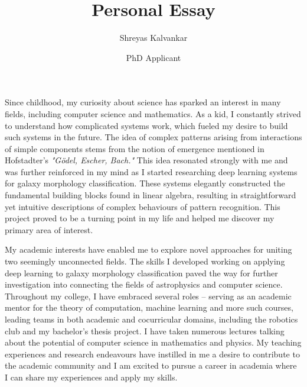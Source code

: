 \documentclass[12pt]{article}
\title{Personal Essay}
\author{Shreyas Kalvankar}
\date{PhD Applicant}
\begin{document}
  \maketitle%
  \thispagestyle{empty}

\vspace{2pt}

Since childhood, my curiosity about science has sparked an
interest in many fields, including computer science and mathematics. As a kid, I
constantly strived to understand how complicated systems work, which fueled my
desire to build such systems in the future. The idea of complex patterns arising
from interactions of simple components stems from the notion of emergence
mentioned in Hofstadter’s \textit{"Gödel, Escher, Bach."} This idea resonated strongly
with me and was further reinforced in my mind as I started researching deep
learning systems for galaxy morphology classification. These systems elegantly
constructed the fundamental building blocks found in linear algebra, resulting
in straightforward yet intuitive descriptions of complex behaviours of pattern
recognition. This project proved to be a turning point in my life and helped me
discover my primary area of interest.

My academic interests have enabled me to explore novel approaches for uniting
two seemingly unconnected fields. The skills I developed working on applying
deep learning to galaxy morphology classification paved the way for further
investigation into connecting the fields of astrophysics and computer science.
Throughout my college, I have embraced several roles -- serving as an academic
mentor for the theory of computation, machine learning and more such courses,
leading teams in both academic and cocurricular domains, including the robotics
club and my bachelor’s thesis project. I have taken numerous lectures talking
about the potential of computer science in mathematics and physics. My teaching
experiences and research endeavours have instilled in me a desire to contribute
to the academic community and I am excited to pursue a career in academia where
I can share my experiences and apply my skills.
\end{document}
